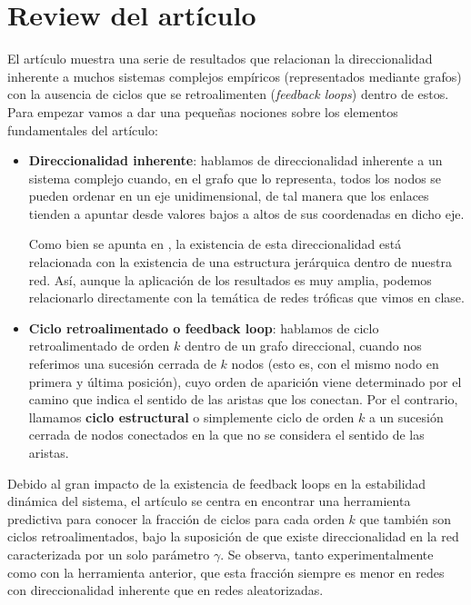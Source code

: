 \documentclass[1p]{elsarticle}
\begin{document}
\section{Review del artículo}
El artículo muestra una serie de resultados que relacionan la direccionalidad inherente a muchos sistemas complejos empíricos (representados mediante grafos) con la ausencia de ciclos que se retroalimenten (\textit{feedback loops}) dentro de estos. 
Para empezar vamos a dar una pequeñas nociones sobre los elementos fundamentales del artículo:
\begin{itemize}
	\item \textbf{Direccionalidad inherente}: hablamos de direccionalidad inherente a un sistema complejo cuando, en el grafo que lo representa, todos los nodos se pueden ordenar en un eje unidimensional, de tal manera que los enlaces tienden a apuntar desde valores bajos a altos de sus coordenadas en dicho eje. 
	
	Como bien se apunta en \cite{arti}, la existencia de esta direccionalidad está relacionada con la existencia de una estructura jerárquica dentro de nuestra red. Así, aunque la aplicación de los resultados es muy amplia, podemos relacionarlo directamente con la temática de redes tróficas que vimos en clase. 

	\item \textbf{Ciclo retroalimentado o feedback loop}: hablamos de ciclo retroalimentado de orden $k$ dentro de un grafo direccional, cuando nos referimos una sucesión cerrada de $k$ nodos (esto es, con el mismo nodo en primera y última posición), cuyo orden de aparición viene determinado por el camino que indica el sentido de las aristas que los conectan.
        Por el contrario, llamamos \textbf{ciclo estructural} o simplemente ciclo de orden $k$ a un sucesión cerrada de nodos conectados en la que no se considera el sentido de las aristas.
\end{itemize}


    Debido al gran impacto de la existencia de feedback loops en la estabilidad dinámica del sistema, el artículo se centra en encontrar una herramienta predictiva para conocer  la fracción de ciclos para cada orden $k$ que también son ciclos retroalimentados, bajo la suposición de que existe direccionalidad en la red caracterizada por un solo parámetro $\gamma$. 
    Se observa, tanto experimentalmente como con la herramienta anterior, que esta fracción siempre es menor en redes con direccionalidad inherente que en redes aleatorizadas.
\end{document}
